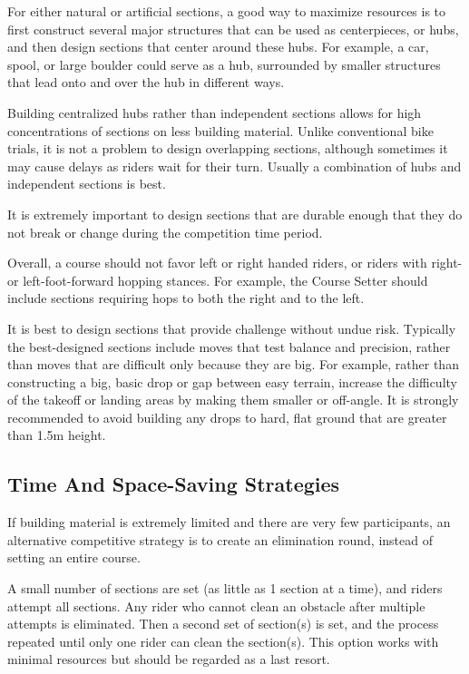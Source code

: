 For either natural or artificial sections, a good way to maximize resources is to first construct several major structures that can be used as centerpieces, or hubs, and then design sections that center around these hubs.
For example, a car, spool, or large boulder could serve as a hub, surrounded by smaller structures that lead onto and over the hub in different ways.

Building centralized hubs rather than independent sections allows for high concentrations of sections on less building material.
Unlike conventional bike trials, it is not a problem to design overlapping sections, although sometimes it may cause delays as riders wait for their turn.
Usually a combination of hubs and independent sections is best.

It is extremely important to design sections that are durable enough that they do not break or change during the competition time period.

Overall, a course should not favor left or right handed riders, or riders with right- or left-foot-forward hopping stances.
For example, the Course Setter should include sections requiring hops to both the right and to the left.

It is best to design sections that provide challenge without undue risk.
Typically the best-designed sections include moves that test balance and precision, rather than moves that are difficult only because they are big.
For example, rather than constructing a big, basic drop or gap between easy terrain, increase the difficulty of the takeoff or landing areas by making them smaller or off-angle.
It is strongly recommended to avoid building any drops to hard, flat ground that are greater than 1.5m height.

\subsection{Time And Space-Saving Strategies}
If building material is extremely limited and there are very few participants, an alternative competitive strategy is to create an elimination round, instead of setting an entire course.

A small number of sections are set (as little as 1 section at a time), and riders attempt all sections.
Any rider who cannot clean an obstacle after multiple attempts is eliminated.
Then a second set of section(s) is set, and the process repeated until only one rider can clean the section(s).
This option works with minimal resources but should be regarded as a last resort.

